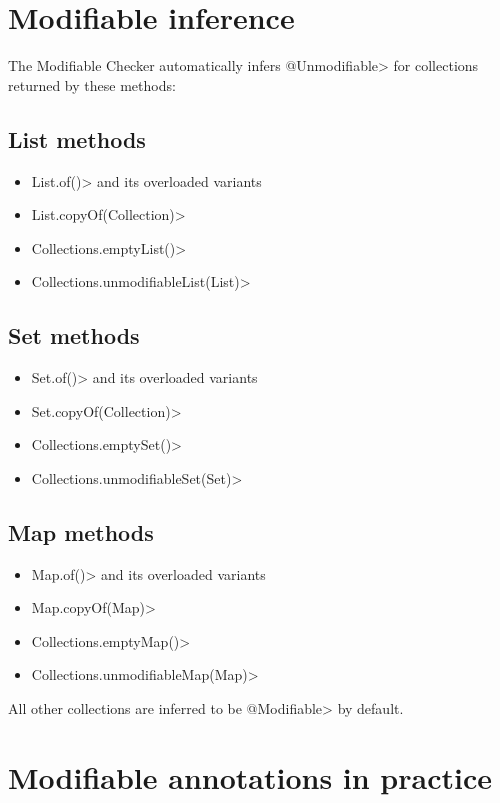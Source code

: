 \section{Modifiable inference\label{modifiable-inference}}

The Modifiable Checker automatically infers \<@Unmodifiable> for collections
returned by these methods:

\subsection{List methods}
\begin{itemize}
\item \<List.of()> and its overloaded variants
\item \<List.copyOf(Collection)>
\item \<Collections.emptyList()>
\item \<Collections.unmodifiableList(List)>
\end{itemize}

\subsection{Set methods}
\begin{itemize}
\item \<Set.of()> and its overloaded variants
\item \<Set.copyOf(Collection)>
\item \<Collections.emptySet()>
\item \<Collections.unmodifiableSet(Set)>
\end{itemize}

\subsection{Map methods}
\begin{itemize}
\item \<Map.of()> and its overloaded variants
\item \<Map.copyOf(Map)>
\item \<Collections.emptyMap()>
\item \<Collections.unmodifiableMap(Map)>
\end{itemize}

All other collections are inferred to be \<@Modifiable> by default.

\section{Modifiable annotations in practice\label{modifiable-examples}}

